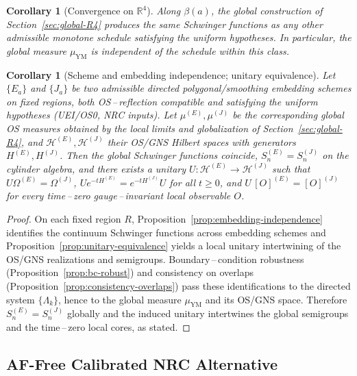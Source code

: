 \documentclass[11pt]{amsart}
\theoremstyle{plain}
\newtheorem{corollary}[theorem]{Corollary}
\theoremstyle{definition}
\theoremstyle{remark}
\begin{document}
\begin{corollary}[Convergence on $\mathbb R^4$]\label{cor:global-convergence}
Along $\beta(a)$, the global construction of Section~\ref{sec:global-R4} produces the same Schwinger functions as any other admissible monotone schedule satisfying the uniform hypotheses. In particular, the global measure $\mu_{\mathrm{YM}}$ is independent of the schedule within this class.
\end{corollary}

\begin{corollary}[Scheme and embedding independence; unitary equivalence]\label{cor:scheme-independence-global}
Let $\{E_a\}$ and $\{J_a\}$ be two admissible directed polygonal/smoothing embedding schemes on fixed regions, both OS\,–\,reflection compatible and satisfying the uniform hypotheses (UEI/OS0, NRC inputs). Let $\mu^{(E)},\mu^{(J)}$ be the corresponding global OS measures obtained by the local limits and globalization of Section~\ref{sec:global-R4}, and $\mathcal H^{(E)},\mathcal H^{(J)}$ their OS/GNS Hilbert spaces with generators $H^{(E)},H^{(J)}$. Then the global Schwinger functions coincide, $S_n^{(E)}=S_n^{(J)}$ on the cylinder algebra, and there exists a unitary $U:\mathcal H^{(E)}\to\mathcal H^{(J)}$ such that $U\Omega^{(E)}=\Omega^{(J)}$, $U e^{-t H^{(E)}}= e^{-t H^{(J)}} U$ for all $t\ge 0$, and $U\,[O]^{(E)}=[O]^{(J)}$ for every time\,–\,zero gauge\,–\,invariant local observable $O$.
\end{corollary}
\begin{proof}
On each fixed region $R$, Proposition~\ref{prop:embedding-independence} identifies the continuum Schwinger functions across embedding schemes and Proposition~\ref{prop:unitary-equivalence} yields a local unitary intertwining of the OS/GNS realizations and semigroups. Boundary\,–\,condition robustness (Proposition~\ref{prop:bc-robust}) and consistency on overlaps (Proposition~\ref{prop:consistency-overlaps}) pass these identifications to the directed system $\{\Lambda_k\}$, hence to the global measure $\mu_{\mathrm{YM}}$ and its OS/GNS space. Therefore $S_n^{(E)}=S_n^{(J)}$ globally and the induced unitary intertwines the global semigroups and the time\,–\,zero local cores, as stated.
\end{proof}

\subsection{AF-Free Calibrated NRC Alternative}\label{subsec:af-free-alternative}
\end{document}
